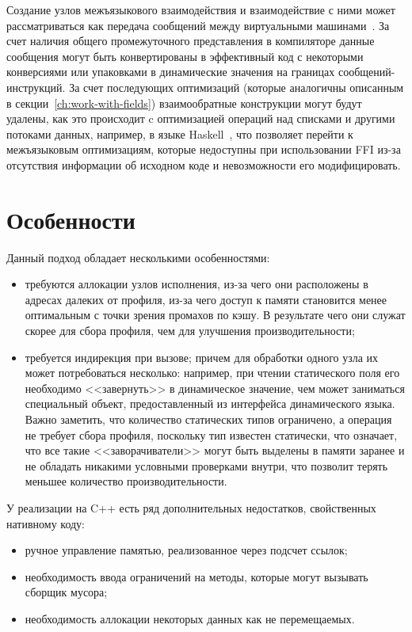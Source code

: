 \documentclass[times
,titlepage
]{itmo-student-thesis}
\begin{document}
Создание узлов межъязыкового взаимодействия и взаимодействие с ними может рассматриваться как передача сообщений между виртуальными машинами~\cite{graalvm-polyglot}. За счет наличия общего промежуточного представления в компиляторе данные сообщения могут быть конвертированы в эффективный код с некоторыми конверсиями или упаковками в динамические значения на границах сообщений-инструкций. За счет последующих оптимизаций (которые аналогичны описанным в секции~\ref{ch:work-with-fields}) взаимообратные конструкции могут будут удалены, как это происходит c оптимизацией операций над списками и другими потоками данных, например, в языке Haskell~\cite{streamfusion}, что позволяет перейти к межъязыковым оптимизациям, которые недоступны при использовании FFI из-за отсутствия информации об исходном коде и невозможности его модифицировать.

\section{Особенности}
Данный подход обладает несколькими особенностями:
\begin{itemize}
	\item требуются аллокации узлов исполнения, из-за чего они расположены в адресах далеких от профиля, из-за чего доступ к памяти становится менее оптимальным с точки зрения промахов по кэшу. В результате чего они служат скорее для сбора профиля, чем для улучшения производительности;
	\item требуется индирекция при вызове; причем для обработки одного узла их может потребоваться несколько: например, при чтении статического поля его необходимо <<завернуть>> в динамическое значение, чем может заниматься специальный объект, предоставленный из интерфейса динамического языка. Важно заметить, что количество статических типов ограничено, а операция не требует сбора профиля, поскольку тип известен статически, что означает, что все такие <<заворачиватели>> могут быть выделены в памяти заранее и не обладать никакими условными проверками внутри, что позволит терять меньшее количество производительности.
\end{itemize}

У реализации на C++ есть ряд дополнительных недостатков, свойственных нативному коду:
\begin{itemize}
	\item ручное управление памятью, реализованное через подсчет ссылок;
	\item необходимость ввода ограничений на методы, которые могут вызывать сборщик мусора;
	\item необходимость аллокации некоторых данных как не перемещаемых.
\end{itemize}
\end{document}
